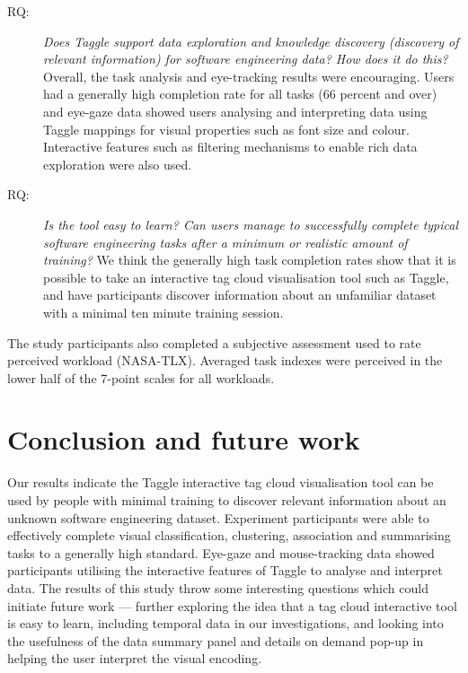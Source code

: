 \begin{description}
\item[RQ:]\textit{Does Taggle support data exploration and knowledge discovery (discovery of relevant information) for software engineering data? How does it do this?} Overall, the task analysis and eye-tracking results were encouraging. Users had a generally high completion rate for all tasks (66 percent and over) and eye-gaze data showed users analysing and interpreting data using Taggle mappings for visual properties such as font size and colour. Interactive features such as filtering mechanisms to enable rich data exploration were also used.
\item[RQ:]\textit{Is the tool easy to learn? Can users manage to successfully complete typical software engineering tasks after a minimum or realistic amount of training?} We think the generally high task completion rates show that it is possible to take an interactive tag cloud visualisation tool such as Taggle, and have participants discover information about an unfamiliar dataset with a minimal ten minute training session. 
\end{description}

The study participants also completed a subjective assessment used to rate perceived workload (NASA-TLX). Averaged task indexes were perceived in the lower half of the 7-point scales for all workloads.

\section{Conclusion and future work}\label{sect:exp3conclusions}

Our results indicate the Taggle interactive tag cloud visualisation tool can be used by people with minimal training to discover relevant information about an unknown software engineering dataset. Experiment participants were able to effectively complete visual classification, clustering, association and summarising tasks to a generally high standard. Eye-gaze and mouse-tracking data showed participants utilising the interactive features of Taggle to analyse and interpret data.  The results of this study throw some interesting questions which could initiate future work --- further exploring the idea that a tag cloud interactive tool is easy to learn, including temporal data in our investigations, and looking into the usefulness of the data summary panel and details on demand pop-up in helping the user interpret the visual encoding. 






